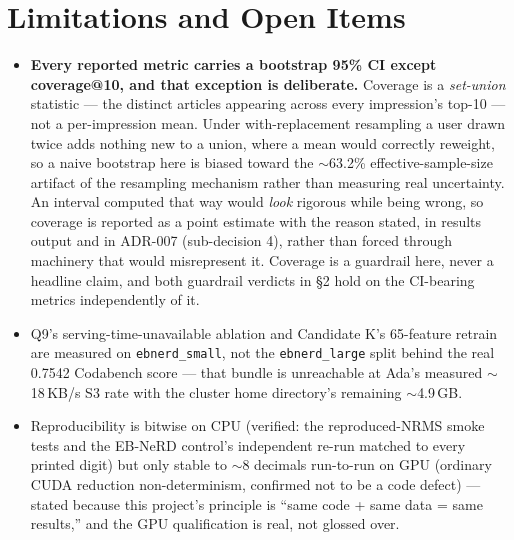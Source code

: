 \documentclass[11pt]{article}
\begin{document}
\section{Limitations and Open Items}

\begin{itemize}
\item \textbf{Every reported metric carries a bootstrap 95\% CI except
  coverage@10, and that exception is deliberate.} Coverage is a \emph{set-union}
  statistic --- the distinct articles appearing across every impression's top-10
  --- not a per-impression mean. Under with-replacement resampling a user drawn
  twice adds nothing new to a union, where a mean would correctly reweight, so a
  naive bootstrap here is biased toward the $\sim$63.2\% effective-sample-size
  artifact of the resampling mechanism rather than measuring real uncertainty. An
  interval computed that way would \emph{look} rigorous while being wrong, so
  coverage is reported as a point estimate with the reason stated, in results
  output and in ADR-007 (sub-decision 4), rather than forced through machinery
  that would misrepresent it. Coverage is a guardrail here, never a headline
  claim, and both guardrail verdicts in \S2 hold on the CI-bearing metrics
  independently of it.
\item Q9's serving-time-unavailable ablation and Candidate K's 65-feature
  retrain are measured on \texttt{ebnerd\_small}, not the \texttt{ebnerd\_large}
  split behind the real 0.7542 Codabench score --- that bundle is unreachable
  at Ada's measured $\sim$18\,KB/s S3 rate with the cluster home directory's
  remaining $\sim$4.9\,GB.
\item Reproducibility is bitwise on CPU (verified: the reproduced-NRMS smoke
  tests and the EB-NeRD control's independent re-run matched to every printed
  digit) but
  only stable to $\sim$8 decimals run-to-run on GPU (ordinary CUDA reduction
  non-determinism, confirmed not to be a code defect) --- stated because this
  project's principle is ``same code + same data = same results,'' and the
  GPU qualification is real, not glossed over.
\end{itemize}
\end{document}
